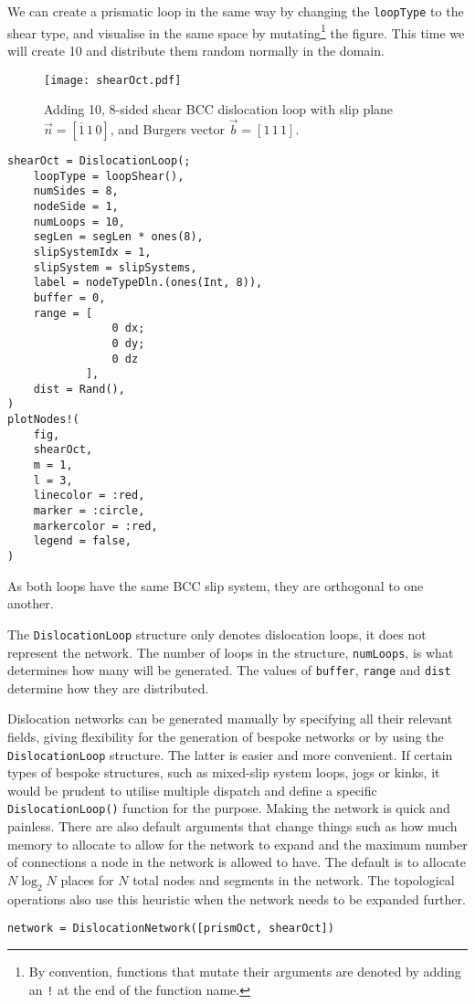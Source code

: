 We can create a prismatic loop in the same way by changing the \texttt{loopType} to the shear type, and visualise in the same space by mutating\footnote{By convention, functions that mutate their arguments are denoted by adding an \texttt{!} at the end of the function name.} the figure. This time we will create 10 and distribute them random normally in the domain.
\begin{figure}
    \centering
    \texttt{[image: shearOct.pdf]}
    \caption[Sample 8-sided shear prismatic BCC dislocation loop.]{Adding 10, 8-sided shear BCC dislocation loop with slip plane $ \vec{n} = [\overline{1}\, 1\, 0] $, and Burgers vector $\vec{b} = [1\, 1\, 1]$.}
\end{figure}
\begin{verbatim}
shearOct = DislocationLoop(;
    loopType = loopShear(),
    numSides = 8,
    nodeSide = 1,
    numLoops = 10,
    segLen = segLen * ones(8),
    slipSystemIdx = 1,
    slipSystem = slipSystems,
    label = nodeTypeDln.(ones(Int, 8)),
    buffer = 0,
    range = [
                0 dx; 
                0 dy;
                0 dz
            ],
    dist = Rand(),
)
plotNodes!(
    fig,
    shearOct,
    m = 1,
    l = 3,
    linecolor = :red,
    marker = :circle,
    markercolor = :red,
    legend = false,
)
\end{verbatim}
As both loops have the same BCC slip system, they are orthogonal to one another.

The \texttt{DislocationLoop} structure only denotes dislocation loops, it does not represent the network. The number of loops in the structure, \texttt{numLoops}, is what determines how many will be generated. The values of \texttt{buffer}, \texttt{range} and \texttt{dist} determine how they are distributed.

Dislocation networks can be generated manually by specifying all their relevant fields, giving flexibility for the generation of bespoke networks or by using the \texttt{DislocationLoop} structure. The latter is easier and more convenient. If certain types of bespoke structures, such as mixed-slip system loops, jogs or kinks, it would be prudent to utilise multiple dispatch and define a specific \texttt{DislocationLoop()} function for the purpose. Making the network is quick and painless. There are also default arguments that change things such as how much memory to allocate to allow for the network to expand and the maximum number of connections a node in the network is allowed to have. The default is to allocate $N\log_2N$ places for $N$ total nodes and segments in the network. The topological operations also use this heuristic when the network needs to be expanded further.
\begin{verbatim}
network = DislocationNetwork([prismOct, shearOct])
\end{verbatim}

